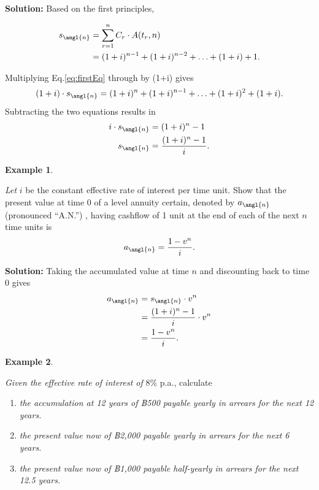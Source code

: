 \documentclass[
]{book}
\theoremstyle{definition}
\theoremstyle{definition}
\newtheorem{example}{Example}[chapter]
\theoremstyle{definition}
\theoremstyle{definition}
\theoremstyle{remark}
\begin{document}
\textbf{Solution:} Based on the first principles,

\begin{align} 
 s_\angl{n} &= \sum_{r=1}^n C_r \cdot A(t_r,n) \\
    &= (1+i)^{n-1} + (1+i)^{n-2} + \ldots + (1+i) + 1. \label{eq:firstEq} 
\end{align}

Multiplying Eq.\eqref{eq:firstEq} through by (1+i) gives \begin{equation}
    (1+i) \cdot s_\angl{n}  = (1+i)^{n} + (1+i)^{n-1} + \ldots + (1+i)^2 + (1+i). 
\end{equation} Subtracting the two equations results in
\[\begin{aligned}
    i \cdot s_\angl{n} &= (1+i)^{n} - 1\\
        s_\angl{n} &= \frac{(1+i)^{n} - 1}{i}.\end{aligned}\]

\begin{example}
\protect\hypertarget{exm:unlabeled-div-26}{}\label{exm:unlabeled-div-26}

\emph{Let} \(i\) be the constant effective rate of interest per time unit. Show
that the present value at time 0 of a level annuity certain, denoted by
\(a_\angl{n}\) (pronounced ``A.N.'') , having cashflow of 1 unit at the end
of each of the next \(n\) time units is
\[a_\angl{n} = \frac{1 - v^n }{i}.\]

\end{example}

\textbf{Solution:} Taking the accumulated value at time \(n\) and discounting
back to time 0 gives \[\begin{aligned}
    a_\angl{n} &= s_\angl{n} \cdot v^n \\
            &= \frac{(1+i)^{n} - 1}{i} \cdot v^n \\
            &=  \frac{1 - v^n }{i}.\end{aligned}\]

\begin{example}
\protect\hypertarget{exm:unlabeled-div-27}{}\label{exm:unlabeled-div-27}

\emph{Given the effective rate of interest of} \(8\%\) p.a., calculate

\begin{enumerate}
\def\labelenumi{\arabic{enumi}.}
\item
  \emph{the accumulation at 12 years of ฿500 payable yearly in arrears for
  the next 12 years.}
\item
  \emph{the present value now of ฿2,000 payable yearly in arrears for the
  next 6 years.}
\item
  \emph{the present value now of ฿1,000 payable half-yearly in arrears for
  the next 12.5 years.}
\end{enumerate}

\end{example}
\end{document}
